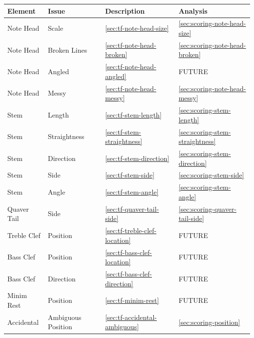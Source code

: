 \begin{table}[H]
    \centering
    \begin{tabularx}{\textwidth}{ llll }
        \toprule

        Element & Issue & Description & Analysis \\
        \midrule
        Note Head       & Scale                  & \cref{sec:tf-note-head-size}              & \cref{sec:scoring-note-head-size} \\
        Note Head       & Broken Lines           & \cref{sec:tf-note-head-broken}            & \cref{sec:scoring-note-head-broken} \\
        Note Head       & Angled                 & \cref{sec:tf-note-head-angled}            & FUTURE \\
        Note Head       & Messy                  & \cref{sec:tf-note-head-messy}             & \cref{sec:scoring-note-head-messy} \\
        Stem            & Length                 & \cref{sec:tf-stem-length}                 & \cref{sec:scoring-stem-length} \\
        Stem            & Straightness           & \cref{sec:tf-stem-straightness}           & \cref{sec:scoring-stem-straightness} \\
        Stem            & Direction              & \cref{sec:tf-stem-direction}              & \cref{sec:scoring-stem-direction} \\
        Stem            & Side                   & \cref{sec:tf-stem-side}                   & \cref{sec:scoring-stem-side} \\
        Stem            & Angle                  & \cref{sec:tf-stem-angle}                  & \cref{sec:scoring-stem-angle} \\
        Quaver Tail     & Side                   & \cref{sec:tf-quaver-tail-side}            & \cref{sec:scoring-quaver-tail-side} \\
        Treble Clef     & Position               & \cref{sec:tf-treble-clef-location}        & FUTURE \\
        Bass Clef       & Position               & \cref{sec:tf-bass-clef-location}          & FUTURE \\
        Bass Clef       & Direction              & \cref{sec:tf-bass-clef-direction}         & FUTURE \\
        Minim Rest      & Position               & \cref{sec:tf-minim-rest}                  & FUTURE \\
        Accidental      & Ambiguous Position     & \cref{sec:tf-accidental-ambiguous}        & \cref{sec:scoring-position} \\

\end{tabularx}
\end{table}
